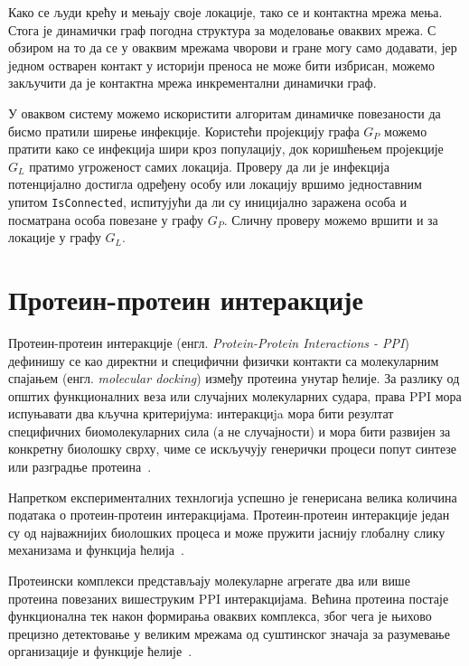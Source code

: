 Како се људи крећу и мењају своје локације, тако се и контактна мрежа мења. Стога је динамички граф погодна структура за моделовање оваквих мрежа. С обзиром на то да се у оваквим мрежама чворови и гране могу само додавати, јер једном остварен контакт у историји преноса не може бити избрисан, можемо закључити да је контактна мрежа инкрементални динамички граф.

У оваквом систему можемо искористити алгоритам динамичке повезаности да бисмо пратили ширење инфекције. Користећи пројекцију графа $G_P$ можемо пратити како се инфекција шири кроз популацију, док коришћењем пројекције $G_L$ пратимо угроженост самих локација. Проверу да ли је инфекција потенцијално достигла одређену особу или локацију вршимо једноставним упитом \texttt{IsConnected}, испитујући да ли су иницијално заражена особа и посматрана особа повезане у графу $G_P$. Сличну проверу можемо вршити и за локације у графу $G_L$.


\section{Протеин-протеин интеракције}

Протеин-протеин интеракције (енгл. \textit{Protein-Protein Interactions - PPI}) дефинишу се као директни и специфични физички контакти са молекуларним спајањем (енгл. \textit{molecular docking}) између протеина унутар ћелије.  За разлику од општих функционалних веза или случајних молекуларних судара, права PPI мора испуњавати два кључна критеријума: интеракциja мора бити резултат специфичних биомолекуларних сила (а не случајности) и мора бити развијен за конкретну биолошку сврху, чиме се искључују генерички процеси попут синтезе или разградње протеина~\cite{delasrivasProteinProteinInteractions2010}. 

Напретком експерименталних технлогија успешно је генерисана велика количина података о протеин-протеин интеракцијама. Протеин-протеин интеракције један су од најважнијих биолошких процеса и може пружити јаснију глобалну слику механизама и функција ћелија~\cite{zhangConstructionDynamicProbabilistic2016}. 

Протеински комплекси представљају молекуларне агрегате два или више протеина повезаних вишеструким PPI интеракцијама. Већина протеина постаје функционална тек након формирања оваквих комплекса, због чега је њихово прецизно детектовање у великим мрежама од суштинског значаја за разумевање организације и функције ћелије~\cite{zhangConstructionDynamicProbabilistic2016}.

